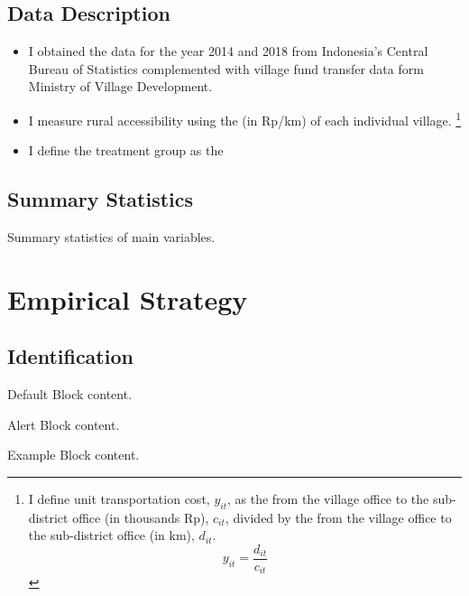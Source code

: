 \documentclass[
11pt,notheorems,compress,hyperref={pdfauthor=Maghfira Ramadhani}
]{beamer}
\begin{document}
\subsection{Data Description}
\begin{frame}
    \begin{itemize}
        \item I obtained the  data for the year 2014 and 2018 from Indonesia's Central Bureau of Statistics complemented with village fund transfer data form Ministry of Village Development.
        \item I measure rural accessibility using the  (in Rp/km) of each individual village. 
        \footnote{I define unit transportation cost, $y_{it}$, as the  from the village office to the sub-district office (in thousands Rp), $c_{it}$, divided by the  from the village office to the sub-district office (in km), $d_{it}$.
        \begin{equation}
        y_{it}=\frac{d_{it}}{c_{it}}    
        \end{equation}}
        \item I define the treatment group as the
    \end{itemize}
\end{frame}

\subsection{Summary Statistics}
\begin{frame}
    \begin{table}[h]
    \caption{Summary statistics of main variables. }
    \scalebox{0.75}{}
    \label{t1}\end{table}
\end{frame}

\section{Empirical Strategy}
\subsection{Identification}
\begin{frame}

   \centering
	\begin{minipage}[b]{0.5\textwidth}

	  \begin{block}{Default}
        Block content.
      \end{block}

      \begin{alertblock}{Alert}
        Block content.
      \end{alertblock}

      \begin{exampleblock}{Example}
        Block content.
      \end{exampleblock}      
      
	\end{minipage}	
\end{frame}
\end{document}
